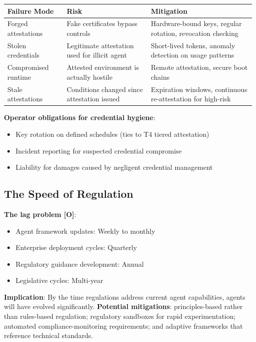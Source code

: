 \documentclass[11pt,letterpaper]{article}
\begin{document}
\begin{warnbox}
\begin{center}
\small
\begin{tabular}{L{3.5cm}L{3cm}L{5.5cm}}
\toprule
\textbf{Failure Mode} & \textbf{Risk} & \textbf{Mitigation} \\
\midrule
Forged attestations & Fake certificates bypass controls & Hardware-bound keys, regular rotation, revocation checking \\
Stolen credentials & Legitimate attestation used for illicit agent & Short-lived tokens, anomaly detection on usage patterns \\
Compromised runtime & Attested environment is actually hostile & Remote attestation, secure boot chains \\
Stale attestations & Conditions changed since attestation issued & Expiration windows, continuous re-attestation for high-risk \\
\bottomrule
\end{tabular}
\end{center}

\textbf{Operator obligations for credential hygiene}:
\begin{itemize}
  \item Key rotation on defined schedules (ties to T4 tiered attestation)
  \item Incident reporting for suspected credential compromise
  \item Liability for damages caused by negligent credential management
\end{itemize}
\end{warnbox}

\subsection{The Speed of Regulation}
\label{sec:speedreg}

\textbf{The lag problem [O]}:
\begin{itemize}
  \item Agent framework updates: Weekly to monthly
  \item Enterprise deployment cycles: Quarterly
  \item Regulatory guidance development: Annual
  \item Legislative cycles: Multi-year
\end{itemize}

\textbf{Implication}: By the time regulations address current agent capabilities, agents will have evolved significantly. \textbf{Potential mitigations}: principles-based rather than rules-based regulation; regulatory sandboxes for rapid experimentation; automated compliance-monitoring requirements; and adaptive frameworks that reference technical standards.
\end{document}
